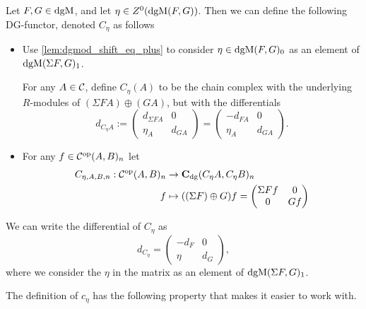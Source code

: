\begin{definition}
    \label{def:dgm_cone}
    Let \( F, G \in \operatorname{dgM} \), and let \( \eta \in Z^0(\operatorname{dgM}(F, G)) \). Then we can define the following DG-functor, denoted \( C_{\eta} \) as follows
    \begin{itemize}
        \item {
            Use \autoref{lem:dgmod_shift_eq_plus} to consider \( \eta \in \operatorname{dgM}(F, G)_0 \) as an element of \( \operatorname{dgM}(\Sigma F, G)_1 \).

            For any \( A \in {\mathcal{C}} \), define \( C_{\eta}(A) \) to be the chain complex with the underlying \( R \)-modules of \( (\Sigma F A) \oplus (G A) \), but with the differentials
            \[
                d_{C_{\eta}A} :=
                \begin{pmatrix}
                    d_{\Sigma F A} & 0 \\
                    \eta_A & d_{GA}
                \end{pmatrix}
                =
                \begin{pmatrix}
                    -d_{F A} & 0 \\
                    \eta_A & d_{GA}
                \end{pmatrix}.
            \]
        }
        \item {
            For any \( f \in {\mathcal{C}}^{\operatorname{op}}(A, B)_n \) let
            \begin{align*}
                C_{\eta, A, B, n}: {\mathcal{C}}^{\operatorname{op}}(A, B)_n &\to \operatorname{\mathbf{C}}_{\operatorname{dg}}(C_{\eta} A, C_{\eta} B)_n \\
                f &\mapsto ((\Sigma F) \oplus G) f = 
                \begin{pmatrix}
                    \Sigma F f & 0 \\
                    0 & G f
                \end{pmatrix}
            \end{align*}
        }
    \end{itemize}
\end{definition}

We can write the differential of \( C_{\eta} \) as
\[
    d_{C_{\eta}} =
    \begin{pmatrix}
        -d_F & 0 \\
        \eta & d_G
    \end{pmatrix},
\]
where we consider the \( \eta \) in the matrix as an element of \( \operatorname{dgM}(\Sigma F, G)_1 \).

The definition of \( c_{\eta} \) has the following property that makes it easier to work with.

